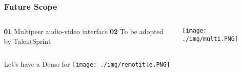\documentclass[14pt]{beamer}
\begin{document}
{
    \begin{frame}    
        \frametitle{\textcolor{whitegray}{Future Scope}}
        \begin{columns}
            \begin{column}{0.5\textwidth}
                \textcolor{whitegray}{\large \textbf{01}}
                \linebreak
                \textcolor{whitegray}{\normalsize Multipeer audio-video interface}
                \linebreak
                \linebreak
                \linebreak
                \textcolor{whitegray}{\large \textbf{02}}
                \linebreak
                \textcolor{whitegray}{\normalsize To be adopted by TalentSprint}
            \end{column}
            \begin{column}{0.5\textwidth}
                \texttt{[image: ./img/multi.PNG]}            
            \end{column}
        \end{columns}
    \end{frame}
}

{
\begin{frame}
    \begin{center} 
        \textcolor{deepblue}{\huge Let's have a Demo for}
        \linebreak 
        \linebreak
        \texttt{[image: ./img/remotitle.PNG]}
    \end{center} 
\end{frame}
}
\end{document}
